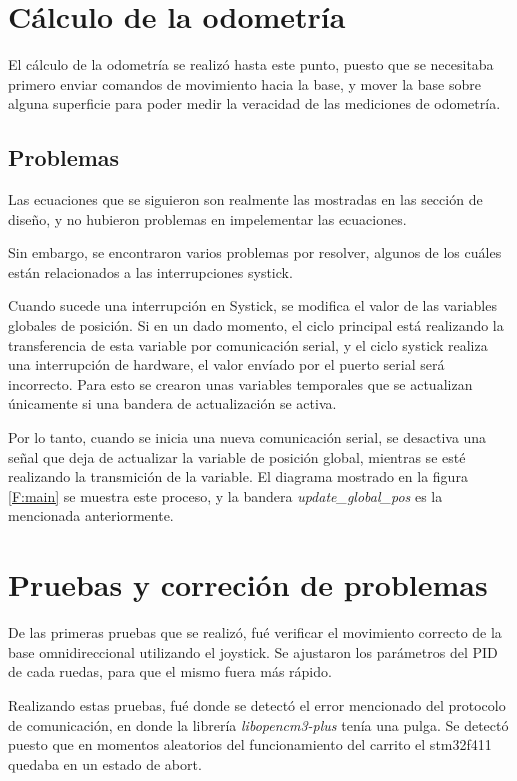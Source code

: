 \section{Cálculo de la odometría}

El cálculo de la odometría se realizó hasta este punto, puesto que se necesitaba primero enviar comandos de movimiento hacia la base, y mover la base sobre alguna superficie para poder medir la veracidad de las mediciones de odometría.

\subsection{Problemas}

Las ecuaciones que se siguieron son realmente las mostradas en las sección de diseño, y no hubieron problemas en impelementar las ecuaciones.

Sin embargo, se encontraron varios problemas por resolver, algunos de los cuáles están relacionados a las interrupciones systick.

Cuando sucede una interrupción en Systick, se modifica el valor de las variables globales de posición. Si en un dado momento, el ciclo principal está realizando la transferencia de esta variable por comunicación serial, y el ciclo systick realiza una interrupción de hardware, el valor envíado por el puerto serial será incorrecto. Para esto se crearon unas variables temporales que se actualizan únicamente si una bandera de actualización se activa.

Por lo tanto, cuando se inicia una nueva comunicación serial, se desactiva una señal que deja de actualizar la variable de posición global, mientras se esté realizando la transmición de la variable. El diagrama mostrado en la figura \ref{F:main} se muestra este proceso, y la bandera \textit{update\_global\_pos} es la mencionada anteriormente.

\section{Pruebas y correción de problemas}

De las primeras pruebas que se realizó, fué verificar el movimiento correcto de la base omnidireccional utilizando el joystick. Se ajustaron los parámetros del PID de cada ruedas, para que el mismo fuera más rápido.

Realizando estas pruebas, fué donde se detectó el error mencionado del protocolo de comunicación, en donde la librería \textit{libopencm3-plus} tenía una pulga. Se detectó puesto que en momentos aleatorios del funcionamiento del carrito el stm32f411 quedaba en un estado de abort.

